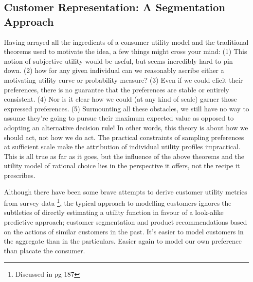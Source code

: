 \documentclass{tufte-handout}
\begin{document}
\subsection{Customer Representation: A Segmentation Approach}
\label{sec:Segmentation}
Having arrayed all the ingredients of a consumer utility model and the traditional theorems used to motivate the idea, a few things might cross your mind: (1) This notion of subjective utility would be useful, but seems incredibly hard to pin-down. (2) how for any given individual can we reasonably ascribe either a motivating utility curve or probability measure? (3) Even if we could elicit their preferences, there is no guarantee that the preferences are stable or entirely consistent. (4) Nor is it clear how we could (at any kind of scale) garner those expressed preferences. (5) Surmounting all these obstacles, we still have no way to assume they're going to pursue their maximum expected value as opposed to adopting an alternative decision rule! In other words, this theory is about how we should act, not how we do act. The practical constraints of sampling preferences at sufficient scale make the attribution of individual utility profiles impractical. This is all true as far as it goes, but the influence of the above theorems and the utility model of rational choice lies in the perspective it offers, not the recipe it prescribes.
\linebreak

\noindent Although there have been some brave attempts to derive customer utility metrics from survey data \footnote{Discussed in \cite{HalpernReasoning}pg 187}, the typical approach to modelling customers ignores the subtleties of directly estimating a utility function in favour of a look-alike predictive approach; customer segmentation and product recommendations based on the actions of similar customers in the past. It's easier to model customers in the aggregate than in the particulars. Easier again to model our own preference than placate the consumer. 
\end{document}
